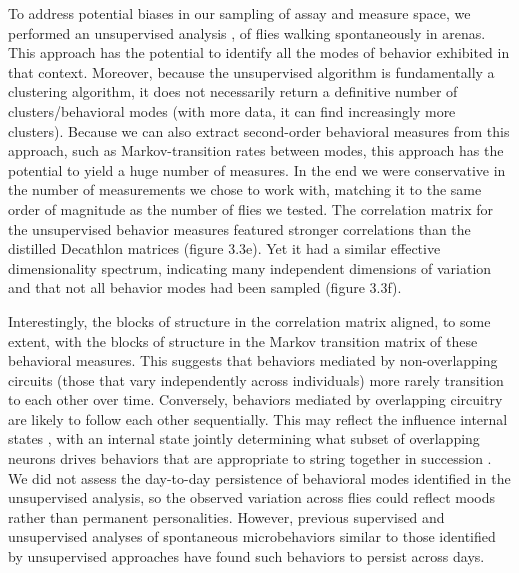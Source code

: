 \documentclass[12pt,letterpaper]{article}
\begin{document}
To address potential biases in our sampling of assay and measure space, we performed an unsupervised analysis \cite{berman_choi_bialek_shaevitz_2014,Cande_Optogenetic_2018}, of flies walking spontaneously in arenas. This approach has the potential to identify all the modes of behavior exhibited in that context. Moreover, because the unsupervised algorithm is fundamentally a clustering algorithm, it does not necessarily return a definitive number of clusters/behavioral modes (with more data, it can find increasingly more clusters). Because we can also extract second-order behavioral measures from this approach, such as Markov-transition rates between modes, this approach has the potential to yield a huge number of measures. In the end we were conservative in the number of measurements we chose to work with, matching it to the same order of magnitude as the number of flies we tested. The correlation matrix for the unsupervised behavior measures featured stronger correlations than the distilled Decathlon matrices (figure 3.3e). Yet it had a similar effective dimensionality spectrum, indicating many independent dimensions of variation and that not all behavior modes had been sampled (figure 3.3f). 

Interestingly, the blocks of structure in the correlation matrix aligned, to some extent, with the blocks of structure in the Markov transition matrix of these behavioral measures. This suggests that behaviors mediated by non-overlapping circuits (those that vary independently across individuals) more rarely transition to each other over time. Conversely, behaviors mediated by overlapping circuitry are likely to follow each other sequentially. This may reflect the influence internal states \cite{Calhoun_Unsupervised_2019}, with an internal state jointly determining what subset of overlapping neurons drives behaviors that are appropriate to string together in succession \cite{Seeds_A_2014}. We did not assess the day-to-day persistence of behavioral modes identified in the unsupervised analysis, so the observed variation across flies could reflect moods rather than permanent personalities. However, previous supervised \cite{Kain_Leg_2013} and unsupervised \cite{Todd_Systematic_2017} analyses of spontaneous microbehaviors similar to those identified by unsupervised approaches have found such behaviors to persist across days.
\end{document}
